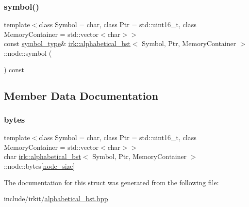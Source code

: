 \subsubsection{\texorpdfstring{symbol()}{symbol()}}
{\footnotesize\ttfamily template$<$class Symbol = char, class Ptr = std\+::uint16\+\_\+t, class Memory\+Container = std\+::vector$<$char$>$$>$ \\
const \mbox{\hyperlink{classirk_1_1alphabetical__bst_a296ccb8fa9fa9dce3b3c3beab0a5ca28}{symbol\+\_\+type}}\& \mbox{\hyperlink{classirk_1_1alphabetical__bst}{irk\+::alphabetical\+\_\+bst}}$<$ Symbol, Ptr, Memory\+Container $>$\+::node\+::symbol (\begin{DoxyParamCaption}{ }\end{DoxyParamCaption}) const\hspace{0.3cm}{\ttfamily [inline]}}



\subsection{Member Data Documentation}
\mbox{\label{structirk_1_1alphabetical__bst_1_1node_a7265f1f590ce88be2460facd16c08611}} 
\subsubsection{\texorpdfstring{bytes}{bytes}}
{\footnotesize\ttfamily template$<$class Symbol = char, class Ptr = std\+::uint16\+\_\+t, class Memory\+Container = std\+::vector$<$char$>$$>$ \\
char \mbox{\hyperlink{classirk_1_1alphabetical__bst}{irk\+::alphabetical\+\_\+bst}}$<$ Symbol, Ptr, Memory\+Container $>$\+::node\+::bytes\mbox{[}\mbox{\hyperlink{classirk_1_1alphabetical__bst_a6f7d3f7002730eb7840e449d4d371235}{node\+\_\+size}}\mbox{]}}



The documentation for this struct was generated from the following file\+:\begin{DoxyCompactItemize}
\item 
include/irkit/\mbox{\hyperlink{alphabetical__bst_8hpp}{alphabetical\+\_\+bst.\+hpp}}\end{DoxyCompactItemize}
